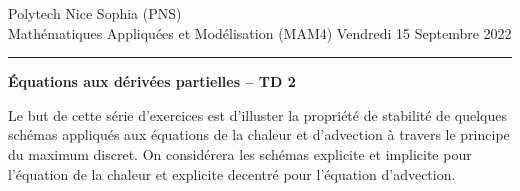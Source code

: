 \documentclass[12pt,a4paper]{article}
\begin{document}
 \hfill Polytech Nice Sophia (PNS)\\
\noindent Math\'ematiques Appliqu\'ees et Mod\'elisation (MAM4) \hfill Vendredi 15 Septembre 2022 \\

\hrule

\bigskip
\bigskip

\begin{center}{\bf \'Equations aux d\'eriv\'ees partielles --
TD 2}\end{center}

\bigskip

\parskip 12pt
Le but de cette s\'erie d'exercices est d'illuster la propri\'et\'e de
stabilit\'e de quelques sch\'emas appliqu\'es aux \'equations de la
chaleur et d'advection \`a travers le principe du maximum discret. On
consid\'erera les sch\'emas explicite et implicite pour l'\'equation
de la chaleur et explicite decentr\'e pour l'\'equation d'advection.
\end{document}
